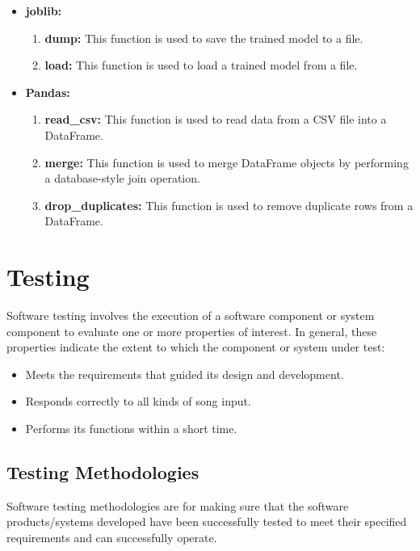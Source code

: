 \documentclass[11pt]{report}
\begin{document}
\begin{itemize}
    \item \textbf{joblib:}
    \begin{enumerate}
        \item \textbf{dump:} This function is used to save the trained model to a file.
        \item \textbf{load:} This function is used to load a trained model from a file.
    \end{enumerate}
\end{itemize}

\begin{itemize}
    \item \textbf{Pandas:}
    \begin{enumerate}
        \item \textbf{read\_csv:} This function is used to read data from a CSV file into a DataFrame.
        \item \textbf{merge:} This function is used to merge DataFrame objects by performing a database-style join operation.
        \item \textbf{drop\_duplicates:} This function is used to remove duplicate rows from a DataFrame.
    \end{enumerate}
\end{itemize}




\chapter{Testing}
 Software testing involves the execution of a software component or system component to evaluate one or more properties of interest. In general, these properties indicate the extent to which the component or system under test:
\begin{itemize}
    \item Meets the requirements that guided its design and development.
    \item Responds correctly to all kinds of song input.
    \item Performs its functions within a short time.
\end{itemize}

\section{Testing Methodologies}
Software testing methodologies are for making sure that the software products/systems developed have been successfully tested to meet their specified requirements and can successfully operate.\\
\end{document}
